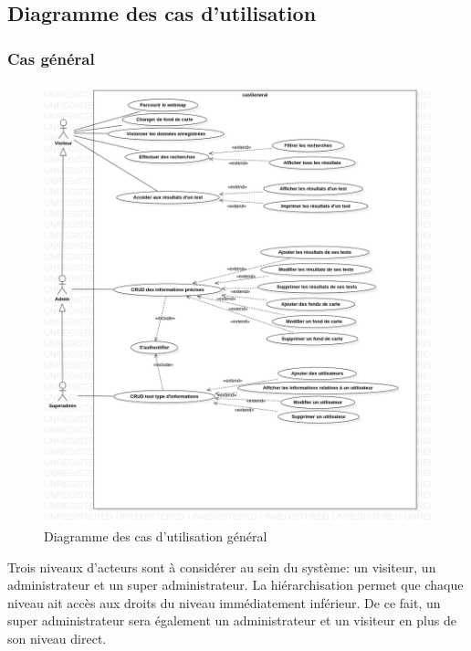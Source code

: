 \subsection{Diagramme des cas d'utilisation}
    \subsubsection{Cas général}
    \paragraph{}
    \begin{figure}
        \centering
        \includegraphics[width=1\textwidth]{images/Analyse_des_besoins/casGeneral.png}
        \caption{Diagramme des cas d'utilisation général}
    \end{figure}
    Trois niveaux d'acteurs sont à considérer au sein du système: un visiteur, 
    un administrateur et un super administrateur. La hiérarchisation permet que 
    chaque niveau ait accès aux droits du niveau immédiatement inférieur. 
    De ce fait, un super administrateur sera également un administrateur et 
    un visiteur en plus de son niveau direct. \par 

